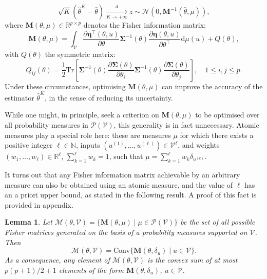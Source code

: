 \documentclass[a4paper]{article}
\newcommand{\B}[1]{{\textcolor{blue}{[bruno: \textit{#1}]}}}
\newtheorem{lemma}[theorem]{Lemma}
\theoremstyle{definition}
\theoremstyle{remark}
\newcommand{\R}{\mathbb{R}}
\newcommand{\N}{\mathbb{N}}
\newcommand{\diff}{\mathrm{d}}
\newcommand{\Conv}{\mathrm{Conv}}
\newcommand{\Tr}{\mathrm{Tr}}
\newcommand{\V}{\mathcal{V}}
\renewcommand{\P}{\mathcal{P}}
\newcommand{\Jb}{\mathbf{J}}
\newcommand{\Mb}{\mathbf{M}}
\newcommand{\etab}{\boldsymbol{\eta}}
\newcommand{\Sigmab}{\boldsymbol{\Sigma}}
\begin{document}
\begin{equation}\label{E:TCL}
\sqrt{K} (\widehat\theta^K-\bar\theta) \xrightarrow[K\to +\infty]{d} z \sim \mathcal{N}\left(0,\Mb^{-1}(\bar\theta,\mu)\right),
\end{equation}
where $\Mb(\theta,\mu)\in \R^{p\times p}$ denotes the Fisher information matrix:
\begin{equation}\label{E:defM}
\Mb(\theta,\mu) = 
\int_\V \frac{\partial\etab^\top(\theta,u)}{\partial\theta}
\Sigmab^{-1}(\theta) \frac{\partial\etab(\theta,u)}{\partial\theta^\top}  \diff \mu(u)+Q(\theta),
\end{equation}
with $Q(\theta)$ the symmetric matrix:
\begin{equation}\label{E:defQ}
Q_{ij}(\theta) = \frac{1}{2} \Tr\left[\Sigmab^{-1}(\theta)\frac{\partial\Sigmab(\theta)}{\partial\theta_i}\Sigmab^{-1}(\theta)\frac{\partial\Sigmab(\theta)}{\partial\theta_j}\right], \quad 1\leq i,j\leq p.
\end{equation}
Under these circumstances, optimising $\Mb(\theta,\mu)$ can improve the accuracy of the estimator $\widehat\theta^K$, in the sense of reducing its uncertainty.

While one might, in principle, seek a criterion on $\Mb(\theta,\mu)$ to be optimised over all probability measures in $\P(\V)$, this generality is in fact unnecessary.
Atomic measures play a special role here: these are measures $\mu$ for which
there exists a positive integer $\ell \in \N$, inputs $(u^{(1)},\dots, u^{(\ell)})\in \V^{\ell}$, and weights $(w_1,\dots,w_{\ell})\in\R^{\ell}$, $\sum_{k=1}^{\ell} w_k =1$, such that  $\mu=\sum_{k=1}^{\ell} w_k \delta_{u^{(k)}}$.

It turns out that any Fisher information matrix achievable by an arbitrary measure can also be obtained using an atomic measure, and the value of $\ell$ has an a priori upper bound,  as stated in the following result. A proof of this fact is provided in appendix.
\begin{lemma}\label{L:conv}
Let $\mathcal{M}(\theta, \V)=\{\Mb(\theta,\mu)\mid \mu \in \P(\V)\}$ be the set of all possible Fisher matrices generated on the basis of a probability measures supported on $\V$.
Then
$$
\mathcal{M}(\theta, \V) = \Conv\{\Mb(\theta,\delta_u)\mid u\in \V\}.
$$
As a consequence, any element of $\mathcal{M}(\theta, \V)$ is the convex sum of at most $p(p+1)/2+1$ elements of the form $\Mb(\theta,\delta_u)$, $u\in \V$.
\end{lemma}
\end{document}
